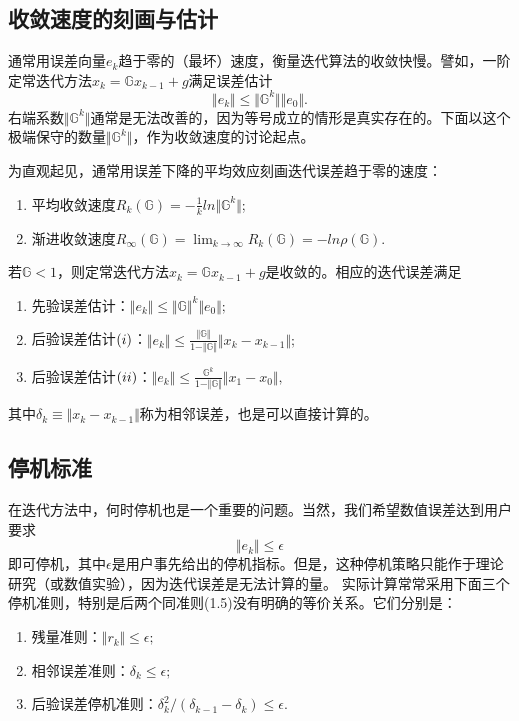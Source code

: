 \documentclass[10pt]{article}
\begin{document}
  \subsection{收敛速度的刻画与估计}
  通常用误差向量$e_k$趋于零的（最坏）速度，衡量迭代算法的收敛快慢。譬如，一阶定常迭代方法$x_k=\mathbb{G}x_{k-1}+g$满足误差估计
  \begin{equation}
  \Vert e_k\Vert\leq\Vert\mathbb{G}^k\Vert\Vert e_0\Vert.
  \end{equation}
  右端系数$\Vert\mathbb{G	}^k\Vert$通常是无法改善的，因为等号成立的情形是真实存在的。下面以这个极端保守的数量$\Vert\mathbb{G}^k\Vert$，作为收敛速度的讨论起点。
  \begin{definition}[收敛速度]
  为直观起见，通常用误差下降的平均效应刻画迭代误差趋于零的速度：
  \begin{enumerate}
  \item 平均收敛速度\indent $R_k(\mathbb{G})=-\frac{1}{k}ln\Vert\mathbb{G}^k\Vert$;
  \item 渐进收敛速度\indent $R_{\infty}(\mathbb{G})=\lim_{k\rightarrow\infty}R_k(\mathbb{G})=-ln\rho(\mathbb{G}).$
  \end{enumerate}
  \end{definition}
  \begin{theorem}
  若$\mathbb{G}<1$，则定常迭代方法$x_k=\mathbb{G}x_{k-1}+g$是收敛的。相应的迭代误差满足\begin{enumerate}
  \item 先验误差估计：\indent $\Vert e_k\Vert\leq\Vert\mathbb{G}\Vert^k\Vert e_0\Vert;$
  \item 后验误差估计$(\uppercase\expandafter{\romannumeral1})$：\indent$\Vert e_k\Vert\leq\frac{\Vert\mathbb{G}\Vert}{1-\Vert\mathbb{G}\Vert}\Vert x_k-x_{k-1}\Vert;$
  \item 后验误差估计$(\uppercase\expandafter{\romannumeral2})$：\indent$\Vert e_k\Vert\leq\frac{\mathbb{G}^k}{1-\Vert\mathbb{G}\Vert}\Vert x_1-x_0\Vert,$
  \end{enumerate}
  其中$\delta_k\equiv\Vert x_k-x_{k-1}\Vert $称为相邻误差，也是可以直接计算的。
  \end{theorem}
  \subsection{停机标准}
  在迭代方法中，何时停机也是一个重要的问题。当然，我们希望数值误差达到用户要求 
  \begin{equation}
  \Vert e_k\Vert\leq \epsilon
\end{equation}    
即可停机，其中$\epsilon$是用户事先给出的停机指标。但是，这种停机策略只能作于理论研究（或数值实验），因为迭代误差是无法计算的量。\newline
实际计算常常采用下面三个停机准则，特别是后两个同准则(1.5)没有明确的等价关系。它们分别是：
\begin{enumerate}
\item 残量准则：$\Vert r_k\Vert\leq\epsilon;$
\item 相邻误差准则：$\delta_k\leq\epsilon;$
\item 后验误差停机准则：$\delta_k^2/(\delta_{k-1}-\delta_k)\leq\epsilon.$
\end{enumerate}
\end{document}
